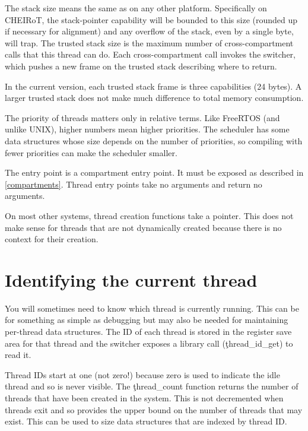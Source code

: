 The stack size means the same as on any other platform.
Specifically on CHEIRoT, the stack-pointer capability will be bounded to this size (rounded up if necessary for alignment) and any overflow of the stack, even by a single byte, will trap.
The trusted stack size is the maximum number of cross-compartment calls that this thread can do.
Each cross-compartment call invokes the switcher, which pushes a new frame on the trusted stack describing where to return.

\begin{note}
In the current version, each trusted stack frame is three capabilities (24 bytes).
A larger trusted stack does not make much difference to total memory consumption.
\end{note}

The priority of threads matters only in relative terms.
Like FreeRTOS (and unlike UNIX), higher numbers mean higher priorities.
The scheduler has some data structures whose size depends on the number of priorities, so compiling with fewer priorities can make the scheduler smaller.

The entry point is a compartment entry point.
It must be exposed as described in \ref{compartments}.
Thread entry points take no arguments and return no arguments.

On most other systems, thread creation functions take a pointer.
This does not make sense for threads that are not dynamically created because there is no context for their creation.

\section{Identifying the current thread}

You will sometimes need to know which thread is currently running.
This can be for something as simple as debugging but may also be needed for maintaining per-thread data structures.
The ID of each thread is stored in the register save area for that thread and the switcher exposes a library call (\c{thread_id_get}) to read it.


Thread IDs start at one (not zero!) because zero is used to indicate the idle thread and so is never visible.
The \c{thread_count} function returns the number of threads that have been created in the system.
This is not decremented when threads exit and so provides the upper bound on the number of threads that may exist.
This can be used to size data structures that are indexed by thread ID.

